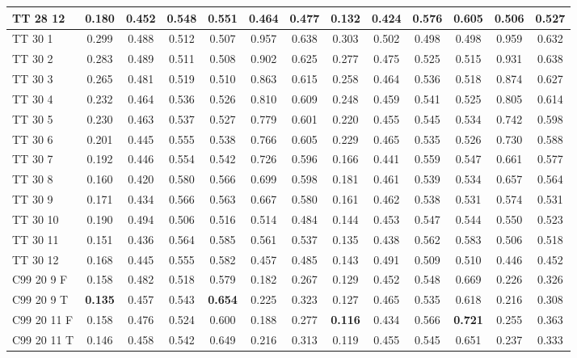\documentclass{article}
\begin{document}
\begin{tabular}{|l|c|c|c|c|c|c||c|c|c|c|c|c|}
TT 28 12 & 0.180 & 0.452 & 0.548 & 0.551 & 0.464 & 0.477 & 0.132 & 0.424 & 0.576 & 0.605 & 0.506 & 0.527\\ \hline
TT 30  1 & 0.299 & 0.488 & 0.512 & 0.507 & 0.957 & 0.638 & 0.303 & 0.502 & 0.498 & 0.498 & 0.959 & 0.632\\ \hline
TT 30  2 & 0.283 & 0.489 & 0.511 & 0.508 & 0.902 & 0.625 & 0.277 & 0.475 & 0.525 & 0.515 & 0.931 & 0.638\\ \hline
TT 30  3 & 0.265 & 0.481 & 0.519 & 0.510 & 0.863 & 0.615 & 0.258 & 0.464 & 0.536 & 0.518 & 0.874 & 0.627\\ \hline
TT 30  4 & 0.232 & 0.464 & 0.536 & 0.526 & 0.810 & 0.609 & 0.248 & 0.459 & 0.541 & 0.525 & 0.805 & 0.614\\ \hline
TT 30  5 & 0.230 & 0.463 & 0.537 & 0.527 & 0.779 & 0.601 & 0.220 & 0.455 & 0.545 & 0.534 & 0.742 & 0.598\\ \hline
TT 30  6 & 0.201 & 0.445 & 0.555 & 0.538 & 0.766 & 0.605 & 0.229 & 0.465 & 0.535 & 0.526 & 0.730 & 0.588\\ \hline
TT 30  7 & 0.192 & 0.446 & 0.554 & 0.542 & 0.726 & 0.596 & 0.166 & 0.441 & 0.559 & 0.547 & 0.661 & 0.577\\ \hline
TT 30  8 & 0.160 & 0.420 & 0.580 & 0.566 & 0.699 & 0.598 & 0.181 & 0.461 & 0.539 & 0.534 & 0.657 & 0.564\\ \hline
TT 30  9 & 0.171 & 0.434 & 0.566 & 0.563 & 0.667 & 0.580 & 0.161 & 0.462 & 0.538 & 0.531 & 0.574 & 0.531\\ \hline
TT 30 10 & 0.190 & 0.494 & 0.506 & 0.516 & 0.514 & 0.484 & 0.144 & 0.453 & 0.547 & 0.544 & 0.550 & 0.523\\ \hline
TT 30 11 & 0.151 & 0.436 & 0.564 & 0.585 & 0.561 & 0.537 & 0.135 & 0.438 & 0.562 & 0.583 & 0.506 & 0.518\\ \hline
TT 30 12 & 0.168 & 0.445 & 0.555 & 0.582 & 0.457 & 0.485 & 0.143 & 0.491 & 0.509 & 0.510 & 0.446 & 0.452\\ \hline\hline
C99 20  9 F & 0.158 & 0.482 & 0.518 & 0.579 & 0.182 & 0.267 & 0.129 & 0.452 & 0.548 & 0.669 & 0.226 & 0.326\\ \hline
C99 20  9 T & \textbf{0.135} & 0.457 & 0.543 & \textbf{0.654} & 0.225 & 0.323 & 0.127 & 0.465 & 0.535 & 0.618 & 0.216 & 0.308\\ \hline
C99 20 11 F & 0.158 & 0.476 & 0.524 & 0.600 & 0.188 & 0.277 & \textbf{0.116} & 0.434 & 0.566 & \textbf{0.721} & 0.255 & 0.363\\ \hline
C99 20 11 T & 0.146 & 0.458 & 0.542 & 0.649 & 0.216 & 0.313 & 0.119 & 0.455 & 0.545 & 0.651 & 0.237 & 0.333\\ \hline

\end{tabular}
\end{document}
